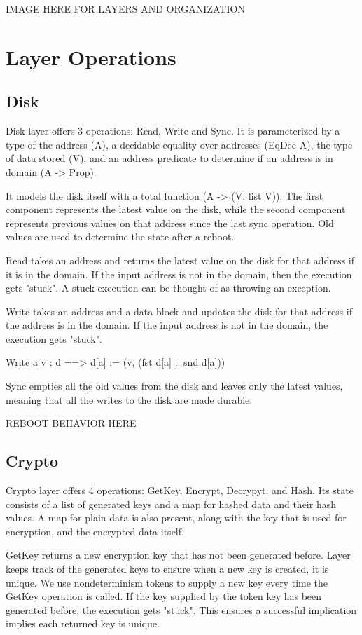 {\color{red} IMAGE HERE FOR LAYERS AND ORGANIZATION}

\section{Layer Operations}
\subsection{Disk}
Disk layer offers 3 operations: Read, Write and Sync. It is parameterized by a type of the address (A), a decidable equality over addresses (EqDec A), the type of data stored (V), and an address predicate to determine if an address is in domain (A -> Prop). 

It models the disk itself with a total function (A -> (V, list V)). The first component represents the latest value on the disk, while the second component represents previous values on that address since the last sync operation. Old values are used to determine the state after a reboot.

Read takes an address and returns the latest value on the disk for that address if it is in the domain. If the input address is not in the domain, then the execution gets "stuck". A stuck execution can be thought of as throwing an exception.

Write takes an address and a data block and updates the disk for that address if the address is in the domain. If the input address is not in the domain, the execution gets "stuck".

Write a v : d ==> d[a] := (v, (fst d[a] :: snd d[a]))

Sync empties all the old values from the disk and leaves only the latest values, meaning that all the writes to the disk are made durable.

{\color{red} REBOOT BEHAVIOR HERE}

\subsection{Crypto}
Crypto layer offers 4 operations: GetKey, Encrypt, Decrypyt, and Hash. Its state consists of a list of generated keys and a map for hashed data and their hash values. A map for plain data is also present, along with the key that is used for encryption, and the encrypted data itself.

GetKey returns a new encryption key that has not been generated before.
Layer keeps track of the generated keys to ensure when a new key is created, it is unique. We use nondeterminism tokens to supply a new key every time the GetKey operation is called. If the key supplied by the token key has been generated before, the execution gets "stuck". This ensures a successful implication implies each returned key is unique.

